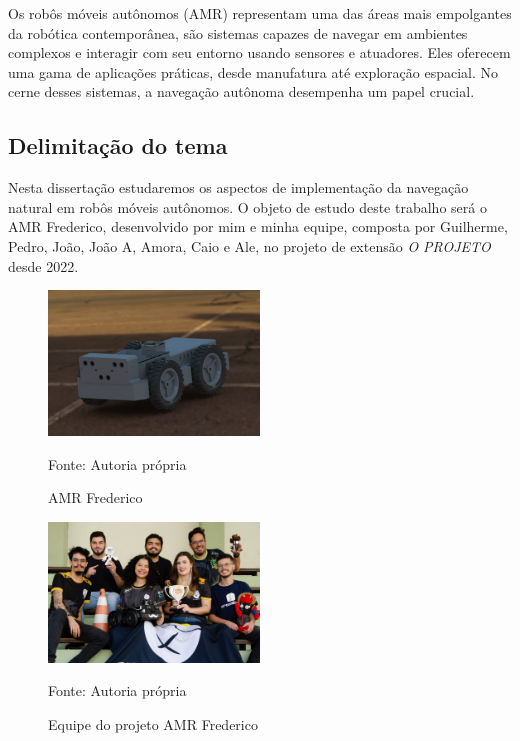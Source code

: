 Os robôs móveis autônomos (AMR) representam uma das áreas mais empolgantes da robótica contemporânea, são sistemas capazes de navegar em ambientes complexos e interagir com seu entorno usando sensores e atuadores. Eles oferecem uma gama de aplicações práticas, desde manufatura até exploração espacial. No cerne desses sistemas, a navegação autônoma desempenha um papel crucial.


\subsection{Delimitação do tema}

Nesta dissertação estudaremos os aspectos de implementação da navegação natural em robôs móveis autônomos. O objeto de estudo deste trabalho será o AMR Frederico, desenvolvido por mim e minha equipe, composta por Guilherme, Pedro, João, João A, Amora, Caio e Ale, no projeto de extensão \emph{O PROJETO} desde 2022. 

\begin{figure}[h]
    \centering
    \captionsetup{justification=centering}
    \caption{\small AMR Frederico}
    \includegraphics[width=0.5\textwidth]{imagens/projeto-fred.jpeg}
    
    {\small Fonte: Autoria própria}
\end{figure}

\begin{figure}[h]
    \centering
    \captionsetup{justification=centering}
    \caption{\small Equipe do projeto AMR Frederico}
    \includegraphics[width=0.5\textwidth]{imagens/TIme-fred.jpeg}
    
    {\small Fonte: Autoria própria}
\end{figure}

